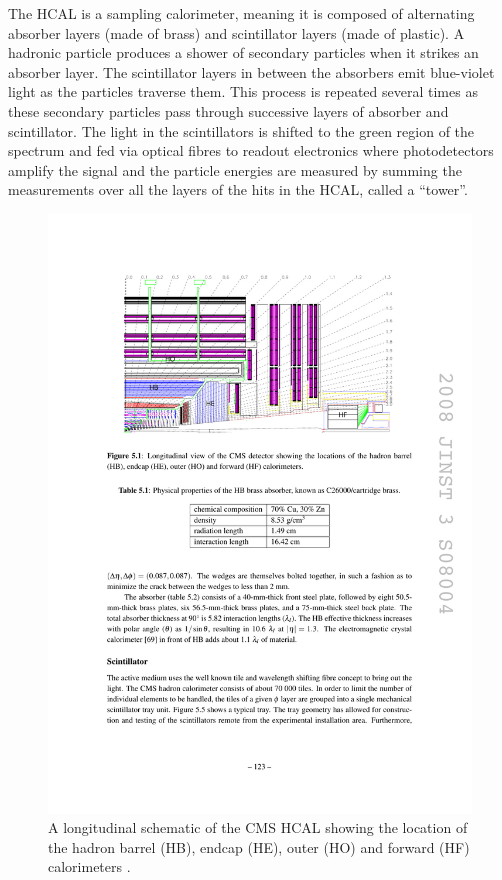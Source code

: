 The HCAL is a sampling calorimeter, meaning it is composed of alternating absorber layers (made of brass) and
scintillator layers (made of plastic). A hadronic particle produces a shower of secondary particles when it
strikes an absorber layer. The scintillator layers in between the absorbers emit blue-violet light as the
particles traverse them. This process is repeated several times as these secondary particles pass through
successive layers of absorber and scintillator. The light in the scintillators is shifted to the green region
of the spectrum and fed via optical fibres to readout electronics where photodetectors amplify the signal and
the particle energies are measured by summing the measurements over all the layers of the hits in
the HCAL, called a ``tower''.

\begin{figure}[hbtp]
   \centering
     \includegraphics[width=\textwidth]{Chapters/04_Detector/Images/HCAL.pdf}\hfill
     \caption[A longitudinal schematic of the CMS HCAL.]{A longitudinal schematic of the CMS HCAL showing the
     location of the hadron barrel (HB), endcap (HE), outer (HO) and forward (HF) calorimeters
     \cite{CMS_experiment}.}
     \label{fig:CMS_HCAL}
\end{figure} 

